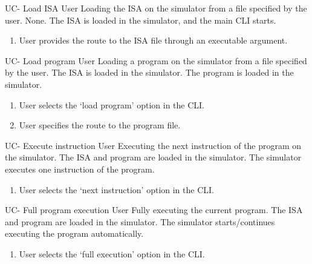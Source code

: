 

\setcounter{i}{1}

\begin{useCase}{UC-}
  {Load \gls{ISA}}  %
  {User}  %
  {Loading the \gls{ISA} on the simulator from a file specified by the user.}  %
  {None.}  %
  {The \gls{ISA} is loaded in the simulator, and the main \gls{CLI} starts.}  %
  \begin{enumerate}[leftmargin=*, topsep=0pt, noitemsep]  %
    \item User provides the route to the \gls{ISA} file through an executable argument.
  \end{enumerate}
\end{useCase}

\begin{useCase}{UC-}
  {Load program}  %
  {User}  %
  {Loading a program on the simulator from a file specified by the user.}  %
  {The \gls{ISA} is loaded in the simulator.}  %
  {The program is loaded in the simulator.}  %
  \begin{enumerate}[leftmargin=*, topsep=0pt, noitemsep]  %
    \item User selects the `load program' option in the \gls{CLI}.
    \item User specifies the route to the program file.
  \end{enumerate}
\end{useCase}

\begin{useCase}{UC-}
  {Execute instruction}  %
  {User}  %
  {Executing the next instruction of the program on the simulator.}  %
  {The \gls{ISA} and program are loaded in the simulator.}  %
  {The simulator executes one instruction of the program.}  %
  \begin{enumerate}[leftmargin=*, topsep=0pt, noitemsep]  %
    \item User selects the `next instruction' option in the \gls{CLI}.
  \end{enumerate}
\end{useCase}

\begin{useCase}{UC-}
  {Full program execution}  %
  {User}  %
  {Fully executing the current program.}  %
  {The \gls{ISA} and program are loaded in the simulator.}  %
  {The simulator starts/continues executing the program automatically.}  %
  \begin{enumerate}[leftmargin=*, topsep=0pt, noitemsep]  %
    \item User selects the `full execution' option in the \gls{CLI}.
  \end{enumerate}
\end{useCase}

